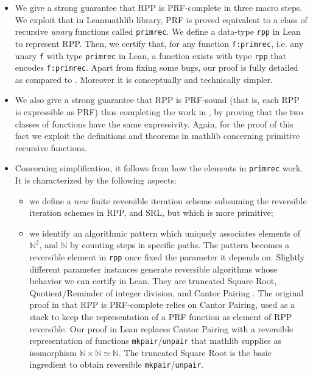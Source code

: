 \documentclass[preprint]{elsarticle}
\theoremstyle{remark}
\newcommand{\RPP}{\textsf{RPP}\xspace}
\newcommand{\PRF}{\textsf{PRF}\xspace}
\newcommand{\MATHLIB}{\textsf{mathlib}\xspace}
\newcommand{\LEAN}{\textsf{Lean}\xspace}
\newcommand{\SRL}{\textsf{SRL}\xspace}
\begin{document}
\begin{itemize}
    \item We give a strong guarantee that \RPP is \PRF-complete in three macro steps. We exploit that in \LEAN \MATHLIB library, \PRF is proved equivalent to a class of recursive \emph{unary} functions called \lstinline|primrec|. We define a data-type \lstinline|rpp| in \LEAN to represent \RPP. Then, we certify that, for any function \lstinline|f:primrec|, i.e. any unary \lstinline|f| with type \lstinline|primrec| in \LEAN, a function exists with type \lstinline|rpp| that encodes \lstinline|f:primrec|. Apart from fixing some bugs, our proof is fully detailed as compared to \cite{DBLP:journals/tcs/PaoliniPR20}. Moreover it is conceptually and technically simpler.

    \item We also give a strong guarantee that \RPP is \PRF-sound (that is, each \RPP is expressible as \PRF) thus completing the work in \cite{MalettoR22}, by proving that the two classes of functions have the same expressivity. Again, for the proof of this fact we exploit the definitions and theorems in \MATHLIB concerning primitive recursive functions.

    \item Concerning simplification, it follows from how the elements in \lstinline|primrec| work. It is characterized by the following aspects:
    \begin{itemize}
        \item we define a \emph{new} finite reversible iteration scheme subsuming the reversible iteration schemes in \RPP, and \SRL, but which is more primitive;

        \item we identify an algorithmic pattern which uniquely associates elements of
        $ \mathbb{N}^2$, and $ \mathbb{N}$ by counting steps in specific paths.
        The pattern becomes a reversible element in \lstinline|rpp| once fixed the parameter it depends on. Slightly different parameter instances generate reversible algorithms whose behavior we can certify in \LEAN. They are truncated Square Root, Quotient/Reminder of integer division, and Cantor Pairing \cite{Cantor1878,DBLP:journals/corr/Szudzik17}.
        The original proof in \cite{DBLP:journals/tcs/PaoliniPR20} that \RPP is \PRF-complete relies on Cantor Pairing, used as a stack to keep the representation of a \PRF function as element of \RPP reversible.
        Our proof in \LEAN replaces Cantor Pairing with a reversible representation of functions \lstinline|mkpair|/\lstinline|unpair| that \MATHLIB supplies as isomorphism $ \mathbb{N}\times\mathbb{N} \simeq \mathbb{N} $. The truncated Square Root is the basic ingredient to obtain reversible \lstinline|mkpair|/\lstinline|unpair|.
    \end{itemize}
\end{itemize}
\end{document}
